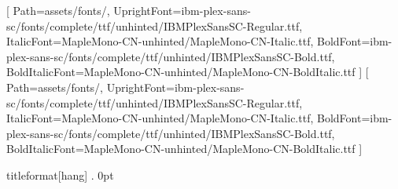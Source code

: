 \usepackage[fontset=none]{ctex}
\usepackage{fontspec}
\usepackage[
  a4paper,
  top=24mm,
  bottom=16mm,
  left=24mm,
  right=24mm,
  headheight=1mm,
  headsep=16mm,
  footskip=10mm
]{geometry}
\setmainfont{IBM Plex Sans}[
  Path=assets/fonts/,
  UprightFont=ibm-plex-sans-sc/fonts/complete/ttf/unhinted/IBMPlexSansSC-Regular.ttf,
  ItalicFont=MapleMono-CN-unhinted/MapleMono-CN-Italic.ttf,
  BoldFont=ibm-plex-sans-sc/fonts/complete/ttf/unhinted/IBMPlexSansSC-Bold.ttf,
  BoldItalicFont=MapleMono-CN-unhinted/MapleMono-CN-BoldItalic.ttf
]
[
  Path=assets/fonts/,
  UprightFont=ibm-plex-sans-sc/fonts/complete/ttf/unhinted/IBMPlexSansSC-Regular.ttf,
  ItalicFont=MapleMono-CN-unhinted/MapleMono-CN-Italic.ttf,
  BoldFont=ibm-plex-sans-sc/fonts/complete/ttf/unhinted/IBMPlexSansSC-Bold.ttf,
  BoldItalicFont=MapleMono-CN-unhinted/MapleMono-CN-BoldItalic.ttf
]
\usepackage{xcolor}
\usepackage{titlesec}
\usepackage{caption}
\usepackage{fancyhdr}
\usepackage{bookmark}
\usepackage[normalem]{ulem}
\renewcommand{\ULthickness}{0.8pt}
\usepackage{hyperref}
\hypersetup{bookmarksopen=true,bookmarksnumbered=true,colorlinks=true,linkcolor=chapterBlue,urlcolor=chapterBlue,citecolor=chapterBlue}
\setcounter{tocdepth}{2}
\setcounter{secnumdepth}{3}
\csname titleformat\endcsname{\chapter}[hang]
  {\normalfont\huge\bfseries\color{chapterBlue}}
  {\thechapter. }
  {0pt}
  {}
\titlespacing*{\chapter}{0pt}{0.5em}{1em}

\renewcommand{\chaptermark}[1]{\markboth{#1}{}}


